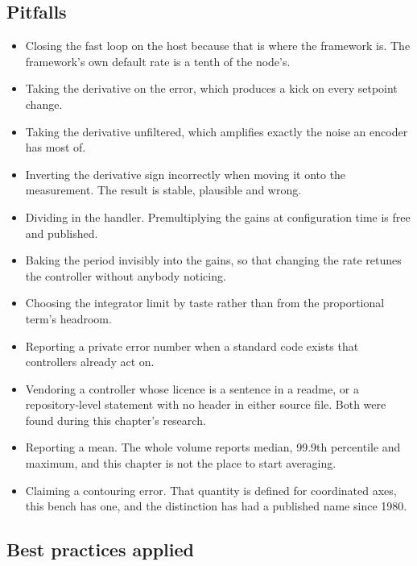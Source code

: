 \subsection*{Pitfalls}

\begin{itemize}
\item Closing the fast loop on the host because that is where the framework is.
The framework's own default rate is a tenth of the node's.
\item Taking the derivative on the error, which produces a kick on every
setpoint change.
\item Taking the derivative unfiltered, which amplifies exactly the noise an
encoder has most of.
\item Inverting the derivative sign incorrectly when moving it onto the
measurement. The result is stable, plausible and wrong.
\item Dividing in the handler. Premultiplying the gains at configuration time is
free and published.
\item Baking the period invisibly into the gains, so that changing the rate
retunes the controller without anybody noticing.
\item Choosing the integrator limit by taste rather than from the proportional
term's headroom.
\item Reporting a private error number when a standard code exists that
controllers already act on.
\item Vendoring a controller whose licence is a sentence in a readme, or a
repository-level statement with no header in either source file. Both were found
during this chapter's research.
\item Reporting a mean. The whole volume reports median, 99.9th percentile and
maximum, and this chapter is not the place to start averaging.
\item Claiming a contouring error. That quantity is defined for coordinated
axes, this bench has one, and the distinction has had a published name since
1980.
\end{itemize}

\subsection*{Best practices applied}

